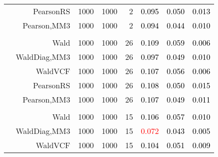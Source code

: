 \documentclass[
]{article}
\begin{document}
\begin{table}[H]
{\begin{tabular}[t]{lrrrrrrr}
\hspace{1em} & PearsonRS & 1000 & 1000 & 2 & \textcolor{black}{0.095} & \textcolor{black}{0.050} & \textcolor{black}{0.013}\\

\hspace{1em} & Pearson,MM3 & 1000 & 1000 & 2 & \textcolor{black}{0.094} & \textcolor{black}{0.044} & \textcolor{black}{0.010}\\
\cmidrule{1-8}
\addlinespace[0.3em]
\multicolumn{8}{l}{\textbf{1F 15V}}\\
\hspace{1em} & Wald & 1000 & 1000 & 26 & \textcolor{black}{0.109} & \textcolor{black}{0.059} & \textcolor{black}{0.006}\\

\hspace{1em} & WaldDiag,MM3 & 1000 & 1000 & 26 & \textcolor{black}{0.097} & \textcolor{black}{0.049} & \textcolor{black}{0.010}\\

\hspace{1em} & WaldVCF & 1000 & 1000 & 26 & \textcolor{black}{0.107} & \textcolor{black}{0.056} & \textcolor{black}{0.006}\\

\hspace{1em} & PearsonRS & 1000 & 1000 & 26 & \textcolor{black}{0.108} & \textcolor{black}{0.050} & \textcolor{black}{0.015}\\

\hspace{1em} & Pearson,MM3 & 1000 & 1000 & 26 & \textcolor{black}{0.107} & \textcolor{black}{0.049} & \textcolor{black}{0.011}\\
\cmidrule{1-8}
\addlinespace[0.3em]
\multicolumn{8}{l}{\textbf{2F 10V}}\\
\hspace{1em} & Wald & 1000 & 1000 & 15 & \textcolor{black}{0.106} & \textcolor{black}{0.057} & \textcolor{black}{0.010}\\

\hspace{1em} & WaldDiag,MM3 & 1000 & 1000 & 15 & \textcolor{red}{0.072} & \textcolor{black}{0.043} & \textcolor{black}{0.005}\\

\hspace{1em} & WaldVCF & 1000 & 1000 & 15 & \textcolor{black}{0.104} & \textcolor{black}{0.051} & \textcolor{black}{0.009}\\


\end{tabular}}
\end{table}
\end{document}
